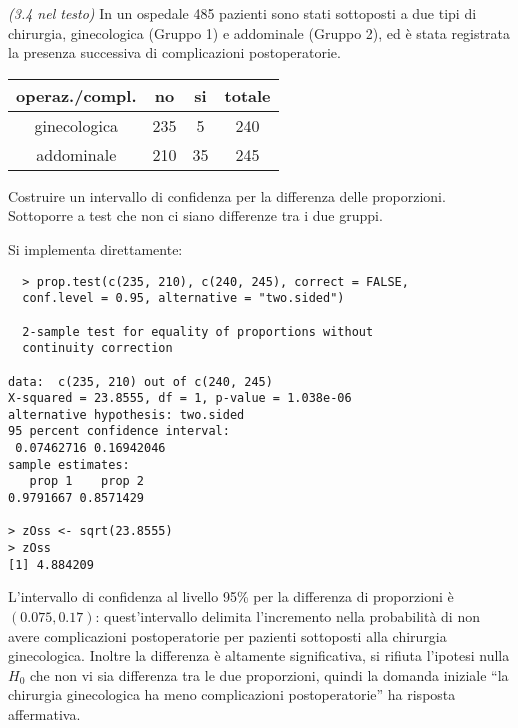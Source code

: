 \begin{exercise}{\emph{(3.4 nel testo)}}
  In un ospedale 485 pazienti sono stati sottoposti a due tipi di
  chirurgia, ginecologica (Gruppo 1) e addominale (Gruppo 2), ed \`e
  stata registrata la presenza successiva di complicazioni
  postoperatorie.
  \begin{table}[h]              %
    \centering
    \begin{tabular}{|c|c|c|c|}
      \hline
      operaz./compl. & no & si & totale \\\hline
      ginecologica & 235 & 5 & 240 \\
      addominale & 210 & 35 & 245 \\ \hline
    \end{tabular}
  \end{table}
  Costruire un intervallo di confidenza per la
  differenza delle proporzioni. Sottoporre a test che non ci siano
  differenze tra i due gruppi.
\end{exercise}
Si implementa direttamente:
\begin{lstlisting}
  > prop.test(c(235, 210), c(240, 245), correct = FALSE,
  conf.level = 0.95, alternative = "two.sided")

  2-sample test for equality of proportions without
  continuity correction

data:  c(235, 210) out of c(240, 245) 
X-squared = 23.8555, df = 1, p-value = 1.038e-06
alternative hypothesis: two.sided 
95 percent confidence interval:
 0.07462716 0.16942046 
sample estimates:
   prop 1    prop 2 
0.9791667 0.8571429 

> zOss <- sqrt(23.8555)
> zOss
[1] 4.884209
\end{lstlisting}
L'intervallo di confidenza al livello 95\% per la differenza di
proporzioni \`e $(0.075, 0.17)$: quest'intervallo delimita
l'incremento nella probabilit\`a di non avere complicazioni
postoperatorie per pazienti sottoposti alla chirurgia
ginecologica. Inoltre la differenza \`e altamente significativa, si
rifiuta l'ipotesi nulla $H_0$ che non vi sia differenza tra le due
proporzioni, quindi la domanda iniziale ``la chirurgia ginecologica ha
meno complicazioni postoperatorie'' ha risposta affermativa.

